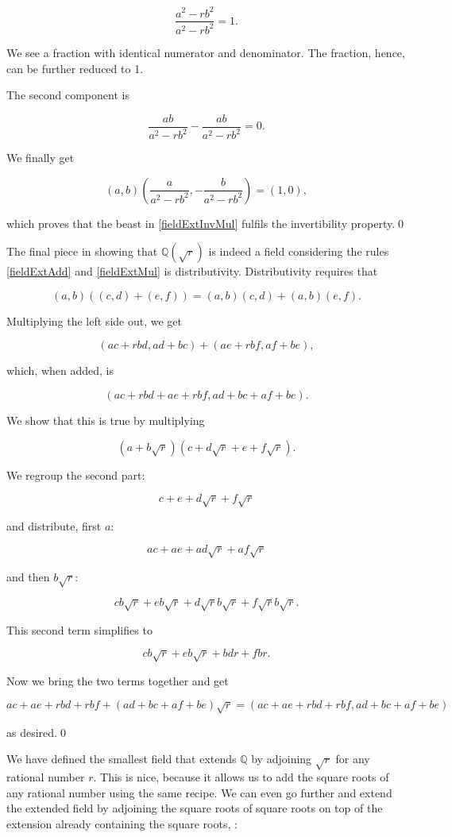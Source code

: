 \documentclass[tikz]{scrreprt}
\begin{document}
\[
\frac{a^2-rb^2}{a^2-rb^2} = 1.
\]

We see a fraction with identical numerator and denominator.
The fraction, hence, can be further reduced to 1.

The second component is

\[
\frac{ab}{a^2-rb^2} - \frac{ab}{a^2-rb^2}=0.
\]

We finally get

\begin{equation}
\left(a,b\right)\left(\frac{a}{a^2-rb^2},-\frac{b}{a^2-rb^2}\right) = (1,0),
\end{equation}

which proves that the beast in \ref{fieldExtInvMul} fulfils
the invertibility property.\qed

The final piece in showing that $\mathbb{Q}(\sqrt{r})$ is indeed
a field considering the rules \ref{fieldExtAdd} and \ref{fieldExtMul}
is distributivity. Distributivity requires that

\begin{equation}
(a,b)((c,d) + (e,f)) = (a,b)(c,d) + (a,b)(e,f).
\end{equation}

Multiplying the left side out, we get

\[
(ac+rbd,ad+bc) + (ae+rbf,af+be),
\]

which, when added, is

\[
(ac+rbd+ae+rbf,ad+bc+af+be).
\]

We show that this is true by multiplying

\[
(a+b\sqrt{r})(c+d\sqrt{r} + e + f\sqrt{r}).
\]

We regroup the second part:

\[
c+e+d\sqrt{r}+f\sqrt{r}
\]

and distribute, first $a$:

\[
ac+ae+ad\sqrt{r}+af\sqrt{r}
\]

and then $b\sqrt{r}$:

\[
cb\sqrt{r}+eb\sqrt{r}+d\sqrt{r}b\sqrt{r}+f\sqrt{r}b\sqrt{r}.
\]

This second term simplifies to

\[
cb\sqrt{r}+eb\sqrt{r}+bdr+fbr.
\]

Now we bring the two terms together and get

\[
ac+ae+rbd+rbf+(ad+bc+af+be)\sqrt{r} = (ac+ae+rbd+rbf,ad+bc+af+be)
\]

as desired.\qed

We have defined the smallest field that extends $\mathbb{Q}$
by adjoining $\sqrt{r}$ for any rational number $r$.
This is nice, because it allows us to add the square roots
of any rational number using the same recipe.
We can even go further and extend the extended field by adjoining
the square roots of square roots on top of the extension already
containing the square roots, \ie:
\end{document}
